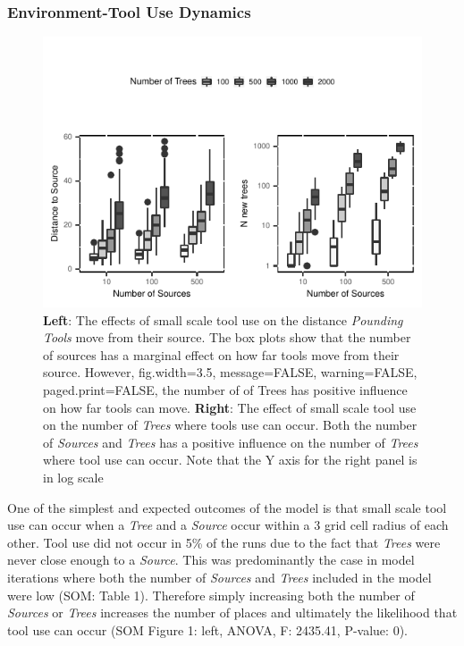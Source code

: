 \documentclass[9pt,twocolumn,twoside,]{pnas-new}
\begin{document}
\hypertarget{environment-tool-use-dynamics}{%
\subsubsection{Environment-Tool Use
Dynamics}\label{environment-tool-use-dynamics}}

\begin{figure}
\centering
\includegraphics{Reeves_et_al_2021_Panda_ABM_files/figure-latex/figure-1-1.pdf}
\caption{\textbf{Left}: The effects of small scale tool use on the
distance \emph{Pounding Tools} move from their source. The box plots
show that the number of sources has a marginal effect on how far tools
move from their source. However, fig.width=3.5, message=FALSE,
warning=FALSE, paged.print=FALSE, the number of of Trees has positive
influence on how far tools can move. \textbf{Right}: The effect of small
scale tool use on the number of \emph{Trees} where tools use can occur.
Both the number of \emph{Sources} and \emph{Trees} has a positive
influence on the number of \emph{Trees} where tool use can occur. Note
that the Y axis for the right panel is in log scale \label{d2source}}
\end{figure}

One of the simplest and expected outcomes of the model is that small
scale tool use can occur when a \emph{Tree} and a \emph{Source} occur
within a 3 grid cell radius of each other. Tool use did not occur in 5\%
of the runs due to the fact that \emph{Trees} were never close enough to
a \emph{Source}. This was predominantly the case in model iterations
where both the number of \emph{Sources} and \emph{Trees} included in the
model were low (SOM: Table 1). Therefore simply increasing both the
number of \emph{Sources} or \emph{Trees} increases the number of places
and ultimately the likelihood that tool use can occur (SOM Figure 1:
left, ANOVA, F: 2435.41, P-value: 0).
\end{document}
